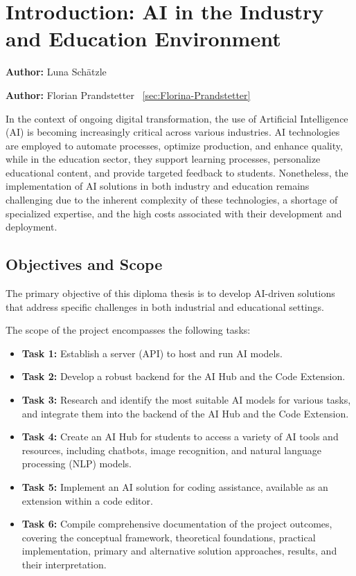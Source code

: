 \chapter{Introduction: AI in the Industry and Education Environment}
\label{chap:introduction}
\textbf{Author:} Luna Schätzle

\textbf{Author:} Florian Prandstetter ~\ref{sec:Florina-Prandstetter}

In the context of ongoing digital transformation, the use of Artificial Intelligence (AI) is becoming increasingly critical across various industries. 
AI technologies are employed to automate processes, optimize production, and enhance quality, while in the education sector, they support learning processes, 
personalize educational content, and provide targeted feedback to students. Nonetheless, 
the implementation of AI solutions in both industry and education remains challenging due to the inherent complexity of these technologies, a shortage of specialized expertise, 
and the high costs associated with their development and deployment.

\section{Objectives and Scope}

The primary objective of this diploma thesis is to develop AI-driven solutions that address specific challenges in both industrial and educational settings.

The scope of the project encompasses the following tasks:
\begin{itemize}
    \item \textbf{Task 1:} Establish a server (API) to host and run AI models.
    \item \textbf{Task 2:} Develop a robust backend for the AI Hub and the Code Extension.
    \item \textbf{Task 3:} Research and identify the most suitable AI models for various tasks, and integrate them into the backend of the AI Hub and the Code Extension.
    \item \textbf{Task 4:} Create an AI Hub for students to access a variety of AI tools and resources, including chatbots, image recognition, and natural language processing (NLP) models.
    \item \textbf{Task 5:} Implement an AI solution for coding assistance, available as an extension within a code editor.
    \item \textbf{Task 6:} Compile comprehensive documentation of the project outcomes, covering the conceptual framework, theoretical foundations, practical implementation, primary and alternative solution approaches, results, and their interpretation.
\end{itemize}

